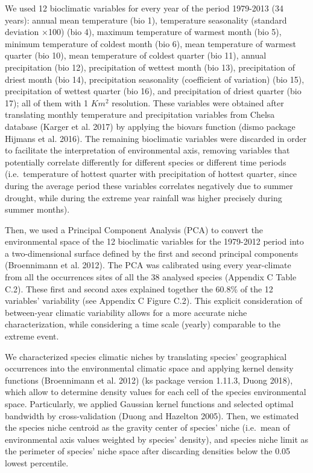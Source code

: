 \documentclass[11pt,twoside]{reedthesis}
\begin{document}
We used 12 bioclimatic variables for every year of the period 1979-2013
(34 years): annual mean temperature (bio 1), temperature seasonality
(standard deviation ×100) (bio 4), maximum temperature of warmest month
(bio 5), minimum temperature of coldest month (bio 6), mean temperature
of warmest quarter (bio 10), mean temperature of coldest quarter (bio
11), annual precipitation (bio 12), precipitation of wettest month (bio
13), precipitation of driest month (bio 14), precipitation seasonality
(coefficient of variation) (bio 15), precipitation of wettest quarter
(bio 16), and precipitation of driest quarter (bio 17); all of them with
1 \(Km^2\) resolution. These variables were obtained after translating
monthly temperature and precipitation variables from Chelsa database
(Karger et al. 2017) by applying the biovars function (dismo package
Hijmans et al. 2016). The remaining bioclimatic variables were discarded
in order to facilitate the interpretation of environmental axis,
removing variables that potentially correlate differently for different
species or different time periods (i.e.~temperature of hottest quarter
with precipitation of hottest quarter, since during the average period
these variables correlates negatively due to summer drought, while
during the extreme year rainfall was higher precisely during summer
months).\par

Then, we used a Principal Component Analysis (PCA) to convert the
environmental space of the 12 bioclimatic variables for the 1979-2012
period into a two-dimensional surface defined by the first and second
principal components (Broennimann et al. 2012). The PCA was calibrated
using every year-climate from all the occurrences sites of all the 38
analysed species (Appendix C Table C.2). These first and second axes
explained together the 60.8\% of the 12 variables' variability (see
Appendix C Figure C.2). This explicit consideration of between-year
climatic variability allows for a more accurate niche characterization,
while considering a time scale (yearly) comparable to the extreme
event.\par

We characterized species climatic niches by translating species'
geographical occurrences into the environmental climatic space and
applying kernel density functions (Broennimann et al. 2012) (ks package
version 1.11.3, Duong 2018), which allow to determine density values for
each cell of the species environmental space. Particularly, we applied
Gaussian kernel functions and selected optimal bandwidth by
cross-validation (Duong and Hazelton 2005). Then, we estimated the
species niche centroid as the gravity center of species' niche
(i.e.~mean of environmental axis values weighted by species' density),
and species niche limit as the perimeter of species' niche space after
discarding densities below the 0.05 lowest percentile.\par
\end{document}
